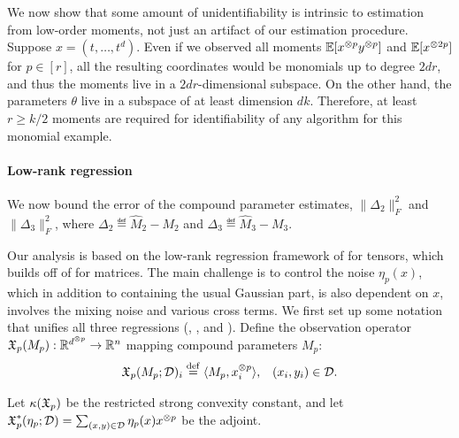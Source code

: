 We now show that some amount of unidentifiability is intrinsic to
estimation from low-order moments, not just an artifact of our
estimation procedure.  Suppose $x = (t, \dots, t^d)$.  Even if we
observed all moments $\operatorname{\mathbb{E}}[x^{\otimes p}y^{\otimes p}]$ and $\operatorname{\mathbb{E}}[x^{\otimes 2p}]$ for $p \in
[r]$, all the resulting coordinates would be monomials up to degree
$2dr$, and thus the moments live in a $2dr$-dimensional subspace.  On
the other hand, the parameters $\theta$ live in a subspace of at least
dimension $dk$.  Therefore, at least $r \ge k/2$ moments are required
for identifiability of any algorithm for this monomial example.

\paragraph{Low-rank regression}
\vspace{-0.5em}
We now bound the error of
the compound parameter estimates,
$\|\Delta_2\|_F^2$ and $\|\Delta_3\|_F^2$,
where $\Delta_2 \eqdef \hat M_2 - M_2$
and $\Delta_3 \eqdef \hat M_3 - M_3$.

Our analysis is based on the low-rank regression framework of
\citet{Tomioka2011} for tensors, which builds off of
\citet{NegahbanWainwright2009} for matrices.
The main challenge is to control the noise $\eta_p(x)$,
which in addition to containing the usual Gaussian part, is also dependent on
$x$, involves the mixing noise and various cross terms.
We first set up some notation that unifies all three regressions (, , and ).
Define the observation operator $\operatorname{\mathfrak{X}}_p(M_p) : \mathbb{R}^{d^{\otimes p}} \to \mathbb{R}^{n}$
mapping compound parameters $M_p$:
\begin{align}
\operatorname{\mathfrak{X}}_p(M_p; \mathcal{D})_i &\stackrel{\rm def}{=} \langle M_p, x^{\otimes p}_i \rangle, & (x_i, y_i) \in \mathcal{D}.
\end{align}

Let $\kappa(\operatorname{\mathfrak{X}}_p)$ be the restricted strong convexity constant,
and let $\operatorname{\mathfrak{X}}^*_p(\eta_p; \mathcal{D}) = \sum_{(x,y) \in \mathcal{D}} \eta_p(x) x^{\otimes p}$
be the adjoint.




